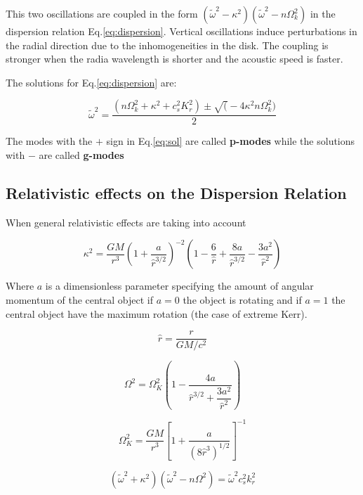 This two oscillations are coupled in the form $(\tilde{\omega}^2 -
\kappa^2)(\tilde{\omega}^2 - n\Omega_k^2)$ in the dispersion relation
Eq.\ref{eq:dispersion}. Vertical oscillations induce perturbations
in the radial direction due to the inhomogeneities in the disk. The
coupling is stronger when the radia wavelength is shorter and the
acoustic speed is faster.

The solutions for Eq.\ref{eq:dispersion} are:

\begin{equation}\label{eq:sol}
\tilde{\omega}^2 = \dfrac{(n\Omega_k^2 + \kappa^2 + c_s^2 K_r^2) \pm
\sqrt( - 4\kappa^2n\Omega_k^2)}{2}
\end{equation}

The modes with the $+$ sign in Eq.\ref{eq:sol} are called
\textbf{p-modes} while the solutions with $-$ are called
\textbf{g-modes}

\subsection{Relativistic effects on the Dispersion Relation}

When general relativistic effects are taking into account 

\begin{equation}
\kappa^2 = \dfrac{GM}{r^3}\left( 1 + \dfrac{a}{\hat{r}^{3/2}}
\right)^{-2} \left(1 - \dfrac{6}{\hat{r}} + \dfrac{8a}{\hat{r}^{3/2}}
- \dfrac{3a^2}{\hat{r}^2}  \right)
\end{equation}

Where $a$ is a dimensionless parameter specifying the amount of
angular momentum of the central object if $a=0$ the object is rotating
and if $a=1$ the central object have the maximum rotation (the case of
extreme Kerr).

\begin{equation}
\hat{r} = \dfrac{r}{GM/c^2}
\end{equation}

\begin{equation}
\Omega_{}^2 = \Omega_{K}^2 \left(1 - \dfrac{4a}{\hat{r}^{3/2} +
\dfrac{3a^2}{\hat{r}^2}} \right)
\end{equation}

\begin{equation}
\Omega_K^2 = \dfrac{GM}{r^3} \left[ 1 + \dfrac{a}{(8
\hat{r}^3)^{1/2}}\right]^{-1}
\end{equation}

\begin{equation}
(\tilde{\omega}^2 + \kappa^2)(\tilde{\omega}^2 - n \Omega_{}^2) =
\tilde{\omega}^2 c_s^2 k_{r}^2
\end{equation}
